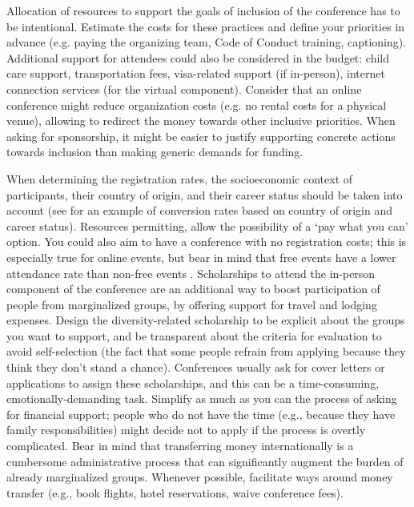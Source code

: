 \documentclass[10pt,letterpaper]{article}
\begin{document}
Allocation of resources to support the goals of inclusion of the conference has to be intentional. 
Estimate the costs for these practices and define your priorities in advance (e.g. paying the organizing team, Code of Conduct training, captioning).
Additional support for attendees could also be considered in the budget: child care support, transportation fees, visa-related support (if in-person), internet connection services (for the virtual component). 
Consider that an online conference might reduce organization costs (e.g. no rental costs for a physical venue), allowing to redirect the money towards other inclusive priorities. 
When asking for sponsorship, it might be easier to justify supporting concrete actions towards inclusion than making generic demands for funding.


When determining the registration rates, the socioeconomic context of participants, their country of origin, and their career status should be taken into account  \cite{sarabipourChangingScientificMeetings2021, andalibPostdocQueueLabour2018, kaplanPostdocNot2012}
(see \cite{canelon2021cost} for an example of conversion rates based on country of origin and career status). 
Resources permitting, allow the possibility of a `pay what you can' option. You could also aim to have a conference with no registration costs; this is especially true for online events, but bear in mind that free events have a lower attendance rate than non-free events \cite{eventbrite_ultimate_2017}. 
Scholarships to attend the in-person component of the conference are an additional way to boost participation of people from marginalized groups, by offering support for travel and lodging expenses.
Design the diversity-related scholarship to be explicit about the groups you want to support, and be transparent about the criteria for evaluation to avoid self-selection (the fact that some people refrain from applying because they think they don't stand a chance). 
Conferences usually ask for cover letters or applications to assign these scholarships, and this can be a time-consuming, emotionally-demanding task. 
Simplify as much as you can the process of asking for financial support; 
people who do not have the time (e.g., because they have family responsibilities) might decide not to apply if the process is overtly complicated. 
Bear in mind that transferring money internationally is a cumbersome administrative process that can significantly augment the burden of already marginalized groups. Whenever possible, facilitate ways around money transfer (e.g., book flights, hotel reservations, waive conference fees).
\end{document}
